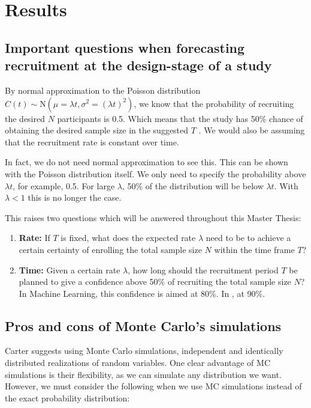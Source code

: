 

\chapter{Results}

\section{Important questions when forecasting recruitment at the design-stage of a study}

By normal approximation to the Poisson distribution $C(t)\sim \textrm{N}(\mu=\lambda t, \sigma^2=(\lambda t)^2)$, we know that the probability of recruiting the desired $N$ participants is 0.5. Which means that the study has 50\% chance of obtaining the desired sample size in the suggested $T$ \citep{carter2004application}. We would also be assuming that the recruitment rate is constant over time.

In fact, we do not need normal approximation to see this. This can be shown with the Poisson distribution itself. We only need to specify the probability above $\lambda t$, for example, 0.5. For large $\lambda$, 50\% of the distribution will be below $\lambda t$. With $\lambda < 1$ this is no longer the case. 

This raises two questions which will be answered throughout this Master Thesis:
\begin{enumerate}
\item \textbf{Rate:} If $T$ is fixed, what does the expected rate $\lambda$ need to be to achieve a certain certainty of enrolling the total sample size $N$ within the time frame $T$?
\item \textbf{Time:} Given a certain rate $\lambda$, how long should the recruitment period $T$ be planned to give a confidence above 50\% of recruiting the total sample size $N$? In Machine Learning, this confidence is aimed at 80\%. In \cite{carter2004application}, at 90\%.
\end{enumerate}

\section{Pros and cons of Monte Carlo's simulations}

Carter suggests using Monte Carlo simulations, independent and identically distributed realizations of random variables. One clear advantage of MC simulations is their flexibility, as we can simulate any distribution we want. However, we must consider the following when we use MC simulations instead of the exact probability distribution:

